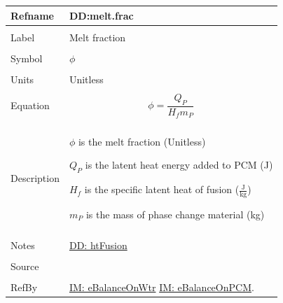\documentclass[12pt]{article}
\begin{document}
\noindent \begin{minipage}{\textwidth}
\begin{tabular}{p{} p{}}
\toprule \textbf{Refname} & \textbf{DD:melt.frac}
\label{DD:melt.frac}
\\ \midrule \\
Label & Melt fraction
\\ \midrule \\
Symbol & $ϕ$
\\ \midrule \\
Units & Unitless
\\ \midrule \\
Equation & \begin{dmath}
           ϕ=\frac{{Q_{P}}}{{H_{f}} {m_{P}}}
           \end{dmath}
\\ \midrule \\
Description & \begin{symbDescription}
              \item{$ϕ$ is the melt fraction (Unitless)}
              \item{${Q_{P}}$ is the latent heat energy added to PCM (J)}
              \item{${H_{f}}$ is the specific latent heat of fusion ($\frac{\text{J}}{\text{kg}}$)}
              \item{${m_{P}}$ is the mass of phase change material (kg)}
              \end{symbDescription}
\\ \midrule \\
Notes & \hyperref[DD:htFusion]{DD: htFusion}
\\ \midrule \\
Source & \cite{koothoor2013}
\\ \midrule \\
RefBy & \hyperref[IM:eBalanceOnWtr]{IM: eBalanceOnWtr} \hyperref[IM:eBalanceOnPCM]{IM: eBalanceOnPCM}.
\\ \bottomrule \end{tabular}
\end{minipage}\\
\end{document}
